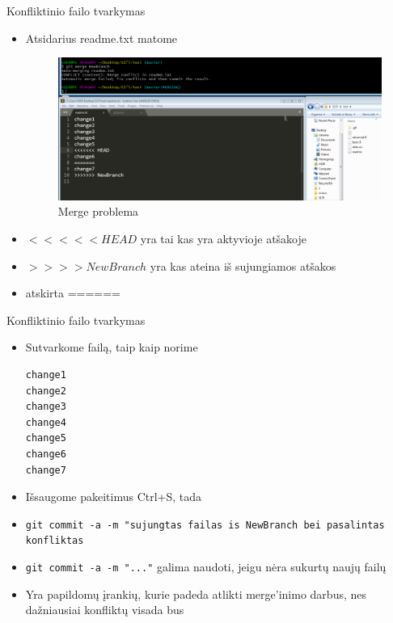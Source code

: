 \documentclass[11pt,xcolor=table]{beamer}
\begin{document}
\begin{frame}[fragile]{Konfliktinio failo tvarkymas}
\begin{itemize}
\item Atsidarius readme.txt matome
\begin{figure}
\caption{Merge problema}
\includegraphics[scale=0.2]{git_flow_2}
\end{figure}

\item $<<<<<HEAD$ yra tai kas yra aktyvioje atšakoje
\item $>>>>NewBranch$ yra kas ateina iš sujungiamos atšakos
\item atskirta ======
\end{itemize}
\end{frame}


\begin{frame}[fragile]{Konfliktinio failo tvarkymas}
\begin{itemize}
\item Sutvarkome failą, taip kaip norime
\begin{lstlisting}
change1
change2
change3
change4
change5
change6
change7
\end{lstlisting}
\item Išsaugome pakeitimus Ctrl+S, tada
\item \colorbox{listinggray}{\lstinline|git commit -a -m "sujungtas failas is NewBranch bei pasalintas konfliktas|}
\item  \colorbox{listinggray}{\lstinline|git commit -a -m "..."|} galima naudoti, jeigu nėra sukurtų naujų failų
\item Yra papildomų įrankių, kurie padeda atlikti merge'inimo darbus, nes dažniausiai konfliktų visada bus
\end{itemize}
\end{frame}
\end{document}
